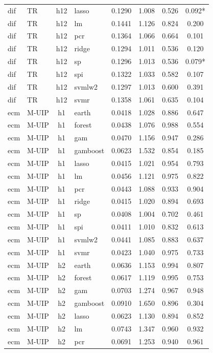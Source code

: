 \begin{ThreePartTable}
\begin{longtable}[t]{llclcccc}
dif & TR & h12 & lasso & 0.1290 & 1.008 & 0.526 & 0.092*\\
dif & TR & h12 & lm & 0.1441 & 1.126 & 0.824 & 0.200\\
dif & TR & h12 & pcr & 0.1364 & 1.066 & 0.664 & 0.101\\
dif & TR & h12 & ridge & 0.1294 & 1.011 & 0.536 & 0.120\\
dif & TR & h12 & sp & 0.1296 & 1.013 & 0.536 & 0.079*\\
dif & TR & h12 & spi & 0.1322 & 1.033 & 0.582 & 0.107\\
dif & TR & h12 & svmlw2 & 0.1297 & 1.013 & 0.600 & 0.391\\
dif & TR & h12 & svmr & 0.1358 & 1.061 & 0.635 & 0.104\\
\addlinespace
ecm & M-UIP & h1 & earth & 0.0418 & 1.028 & 0.886 & 0.647\\
ecm & M-UIP & h1 & forest & 0.0438 & 1.076 & 0.988 & 0.554\\
ecm & M-UIP & h1 & gam & 0.0470 & 1.156 & 0.947 & 0.286\\
ecm & M-UIP & h1 & gamboost & 0.0623 & 1.532 & 0.854 & 0.185\\
ecm & M-UIP & h1 & lasso & 0.0415 & 1.021 & 0.954 & 0.793\\
ecm & M-UIP & h1 & lm & 0.0456 & 1.121 & 0.975 & 0.822\\
ecm & M-UIP & h1 & pcr & 0.0443 & 1.088 & 0.933 & 0.904\\
ecm & M-UIP & h1 & ridge & 0.0415 & 1.020 & 0.894 & 0.693\\
ecm & M-UIP & h1 & sp & 0.0408 & 1.004 & 0.702 & 0.461\\
ecm & M-UIP & h1 & spi & 0.0411 & 1.010 & 0.832 & 0.613\\
ecm & M-UIP & h1 & svmlw2 & 0.0441 & 1.085 & 0.883 & 0.637\\
ecm & M-UIP & h1 & svmr & 0.0423 & 1.040 & 0.975 & 0.733\\
\addlinespace
ecm & M-UIP & h2 & earth & 0.0636 & 1.153 & 0.994 & 0.807\\
ecm & M-UIP & h2 & forest & 0.0617 & 1.119 & 0.995 & 0.753\\
ecm & M-UIP & h2 & gam & 0.0703 & 1.274 & 0.967 & 0.948\\
ecm & M-UIP & h2 & gamboost & 0.0910 & 1.650 & 0.896 & 0.304\\
ecm & M-UIP & h2 & lasso & 0.0623 & 1.130 & 0.894 & 0.852\\
ecm & M-UIP & h2 & lm & 0.0743 & 1.347 & 0.960 & 0.932\\
ecm & M-UIP & h2 & pcr & 0.0691 & 1.253 & 0.940 & 0.961\\

\end{longtable}
\end{ThreePartTable}
